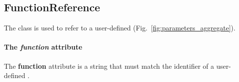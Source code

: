 \subsection{FunctionReference}
\label{sec:function_reference}

The \functionreference{} class is used to refer to a user-defined \function{}
(Fig.~\ref{fig:parameters_aggregate}).

\paragraph{The \textit{function} attribute}
The \textbf{function} attribute is a string that must match the identifier
of a user-defined \function{}.
